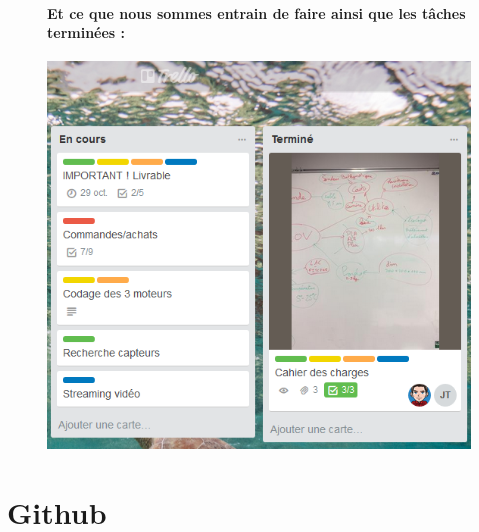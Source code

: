 \documentclass[a4paper,11pt]{report}
\begin{document}
						\begin{figure}[!h]
							\paragraph{\newline Et ce que nous sommes entrain de faire ainsi que les tâches terminées : \newline}
							\begin{center}
								\includegraphics[scale=0.5]{Illustrations/Planning2.png}
							\end{center}
						\end{figure}
        \section{Github}
					
\end{document}
